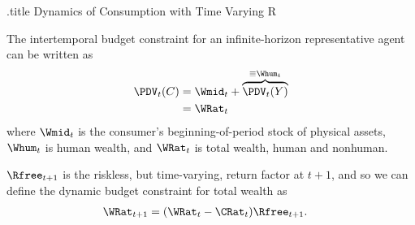 \documentclass{handout}
\begin{document}
\handoutHeader

\begin{verbatimwrite}{\jobname.title}
Dynamics of Consumption with Time Varying R
\end{verbatimwrite}

\handoutNameMake

The intertemporal budget constraint for an infinite-horizon 
representative agent can be written as
\begin{equation}\begin{gathered}\begin{aligned}
        \PDV_{t}(C) & =  \Wmid_{t}+ \overbrace{\PDV_{t}(Y)}^{\equiv \Whum_{t}}
\\  & =  \WRat_{t} 
\end{aligned}\end{gathered}\end{equation}
where $\Wmid_{t}$ is the consumer's beginning-of-period stock of
physical assets, $\Whum_{t}$ is human wealth, and $\WRat_{t}$ is total
wealth, human and nonhuman.

$\Rfree_{t+1}$ is the riskless, but time-varying, return factor at $t+1$, and so we can define the dynamic budget constraint for total 
wealth as
\begin{equation}\begin{gathered}\begin{aligned}
        \WRat_{t+1} & =  (\WRat_{t}-\CRat_{t})\Rfree_{t+1}. \label{eq:dbc}
\end{aligned}\end{gathered}\end{equation}
\end{document}
